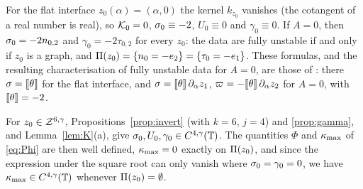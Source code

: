 \begin{example}\label{ex:A0}
For the flat interface $z_0(\alpha)=(\alpha,0)$ the kernel $k_{z_0}$ vanishes (the cotangent of a real number is real), so $\mathcal{K}_0=0$, $\sigma_0\equiv-2$, $U_0\equiv0$ and $\gamma_0\equiv0$.
If $A=0$, then $\sigma_0=-2n_{0,2}$ and $\gamma_0=-2\tau_{0,2}$ for every $z_0$: the data are fully unstable if and only if $z_0$ is a graph, and $\Pi(z_0)=\{n_0=-e_2\}=\{\tau_0=-e_1\}$.
These formulas, and the resulting characterisation of fully unstable data for $A=0$, are those of \cite[Secs.~1.2 and~3.1.3]{LM26}: there $\sigma=[\![\theta]\!]$ for the flat interface, and
$\sigma=[\![\theta]\!]\,\partial_\alpha z_1$, $\varpi=-[\![\theta]\!]\,\partial_\alpha z_2$ for $A=0$, with $[\![\theta]\!]=-2$.
\end{example}

For $z_0\in\mathcal{Z}^{6,\gamma}$, Propositions~\ref{prop:invert} (with $k=6$, $j=4$) and \ref{prop:gamma}, and Lemma~\ref{lem:K}(a), give $\sigma_0,U_0,\gamma_0\in C^{4,\gamma}(\mathbb{T})$. The quantities
$\Phi$ and $\kappa_{\max}$ of \eqref{eq:Phi} are then well defined, $\kappa_{\max}=0$ exactly on $\Pi(z_0)$, and since the expression under the square root can only vanish where
$\sigma_0=\gamma_0=0$, we have $\kappa_{\max}\in C^{4,\gamma}(\mathbb{T})$ whenever $\Pi(z_0)=\emptyset$.
